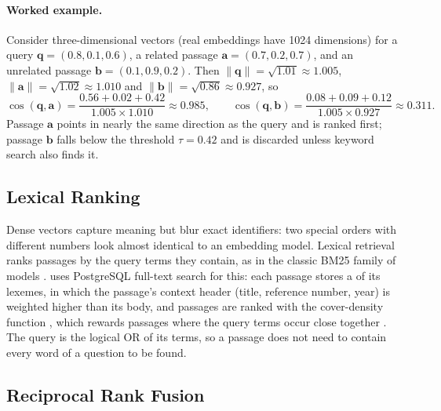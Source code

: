 \paragraph{Worked example.} Consider three-dimensional vectors (real embeddings have 1024 dimensions) for a query $\mathbf{q} = (0.8, 0.1, 0.6)$, a related passage $\mathbf{a} = (0.7, 0.2, 0.7)$, and an unrelated passage $\mathbf{b} = (0.1, 0.9, 0.2)$. Then $\lVert\mathbf{q}\rVert = \sqrt{1.01} \approx 1.005$, $\lVert\mathbf{a}\rVert = \sqrt{1.02} \approx 1.010$ and $\lVert\mathbf{b}\rVert = \sqrt{0.86} \approx 0.927$, so
\begin{equation*}
  \cos(\mathbf{q}, \mathbf{a}) = \frac{0.56 + 0.02 + 0.42}{1.005 \times 1.010} \approx 0.985,
  \qquad
  \cos(\mathbf{q}, \mathbf{b}) = \frac{0.08 + 0.09 + 0.12}{1.005 \times 0.927} \approx 0.311 .
\end{equation*}
Passage $\mathbf{a}$ points in nearly the same direction as the query and is ranked first; passage $\mathbf{b}$ falls below the threshold $\tau = 0.42$ and is discarded unless keyword search also finds it.

\subsection{Lexical Ranking}\label{sec:lexical}

Dense vectors capture meaning but blur exact identifiers: two special orders with different numbers look almost identical to an embedding model. Lexical retrieval ranks passages by the query terms they contain, as in the classic BM25 family of models \citep{robertson2009bm25}. \cs{} uses PostgreSQL full-text search for this: each passage stores a  of its lexemes, in which the passage's context header (title, reference number, year) is weighted higher than its body, and passages are ranked with the cover-density function , which rewards passages where the query terms occur close together \citep{postgres2024fts}. The query is the logical OR of its terms, so a passage does not need to contain every word of a question to be found.

\subsection{Reciprocal Rank Fusion}\label{sec:rrf}

